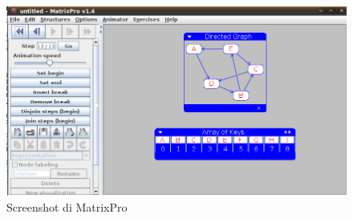 \begin{figure}
\centering
\includegraphics[scale=0.25]{images/MatrixPro_screenshot.png}
\caption{Screenshot di MatrixPro}
\end{figure} 

